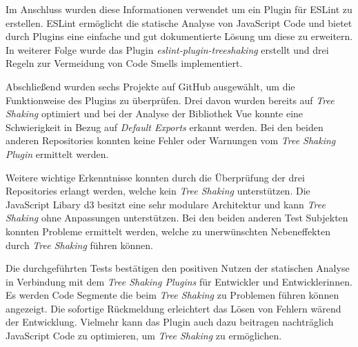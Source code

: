 Im Anschluss wurden diese Informationen verwendet um ein Plugin für ESLint zu erstellen. ESLint ermöglicht die statische Analyse von JavaScript Code und bietet durch Plugins eine einfache und gut dokumentierte Lösung um diese zu erweitern. In weiterer Folge wurde das Plugin \textit{eslint-plugin-treeshaking} erstellt und drei Regeln zur Vermeidung von Code Smells implementiert.

Abschließend wurden sechs Projekte auf GitHub ausgewählt, um die Funktionweise des Plugins zu überprüfen. Drei davon wurden bereits auf \textit{Tree Shaking} optimiert und bei der Analyse der Bibliothek Vue konnte eine Schwierigkeit in Bezug auf \textit{Default Exports} erkannt werden. Bei den beiden anderen Repositories konnten keine Fehler oder Warnungen vom \textit{Tree Shaking Plugin} ermittelt werden.

Weitere wichtige Erkenntnisse konnten durch die Überprüfung der drei Repositories erlangt werden, welche kein \textit{Tree Shaking} unterstützen. Die JavaScript Libary d3 besitzt eine sehr modulare Architektur und kann \textit{Tree Shaking} ohne Anpassungen unterstützen. Bei den beiden anderen Test Subjekten konnten Probleme ermittelt werden, welche zu unerwünschten Nebeneffekten durch \textit{Tree Shaking} führen können.

Die durchgeführten Tests bestätigen den positiven Nutzen der statischen Analyse in Verbindung mit dem \textit{Tree Shaking Plugins} für Entwickler und Entwicklerinnen. Es werden Code Segmente die beim \textit{Tree Shaking} zu Problemen führen können angezeigt. Die sofortige Rückmeldung erleichtert das Lösen von Fehlern wärend der Entwicklung. Vielmehr kann das Plugin auch dazu beitragen nachträglich JavaScript Code zu optimieren, um \textit{Tree Shaking} zu ermöglichen.